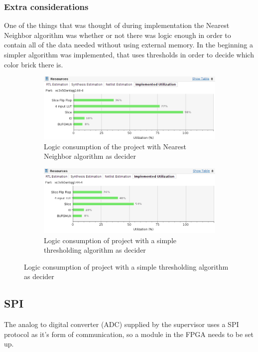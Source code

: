 \subsubsection{Extra considerations}
One of the things that was thought of during implementation the Nearest Neighbor algorithm was whether or not there was logic enough in order to contain all of the data needed without using external memory. In the beginning a simpler algorithm was implemented, that uses thresholds in order to decide which color brick there is.

\begin{figure}[H]
 \centering
\setlength{\belowcaptionskip}{5pt}

\begin{subfigure}[b]{0.70\textwidth}
\includegraphics[width=\linewidth]{img/nearest_neighbor.png}
\caption{Logic consumption of the project with Nearest Neighbor algorithm as decider}
\end{subfigure}

\begin{subfigure}[b]{0.70\textwidth}
\centering
\includegraphics[width=\linewidth]{img/thresholding.png}
\caption{Logic consumption of project with a simple thresholding algorithm as decider}
\end{subfigure}

\end{figure}

\subsection{SPI}
The analog to digital converter (ADC) supplied by the supervisor uses a SPI protocol as it's form of communication, so a module in the FPGA needs to be set up.

